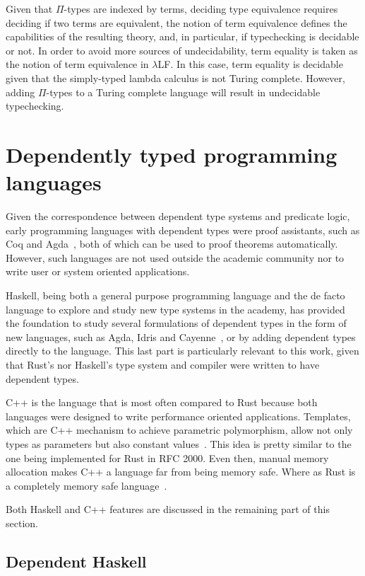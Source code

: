 Given that $\Pi$-types are indexed by terms, deciding type equivalence requires
deciding if two terms are equivalent, the notion of term equivalence defines the
capabilities of the resulting theory, and, in particular, if typechecking is
decidable or not. In order to avoid more sources of undecidability, term
equality is taken as the notion of term equivalence in $\lambda$LF. In this
case, term equality is decidable given that the simply-typed lambda calculus is
not Turing complete. However, adding $\Pi$-types to a Turing complete language
will result in undecidable typechecking.

\section{Dependently typed programming languages}

Given the correspondence between dependent type systems and predicate logic,
early programming languages with dependent types were proof assistants, such as
Coq and Agda~\cite{agda}, both of which can be used to proof theorems
automatically.  However, such languages are not used outside the academic
community nor to write user or system oriented applications.

Haskell, being both a general purpose programming language and the de facto
language to explore and study new type systems in the academy, has provided the
foundation to study several formulations of dependent types in the form of new
languages, such as Agda, Idris \cite{idris} and Cayenne~\cite{cayenne}, or by
adding dependent types directly to the language. This last part is particularly
relevant to this work, given that Rust's nor Haskell's type system and compiler
were written to have dependent types.

C++ is the language that is most often compared to Rust because both languages
were designed to write performance oriented applications. Templates, which are
C++ mechanism to achieve parametric polymorphism, allow not only types as
parameters but also constant values~\cite{templates}. This idea is pretty
similar to the one being implemented for Rust in RFC 2000. Even then, manual
memory allocation makes C++ a language far from being memory safe. Where as Rust
is a completely memory safe language~\cite{ralf}.    

Both Haskell and C++ features are discussed in the remaining part of this
section.

\subsection{Dependent Haskell} 

